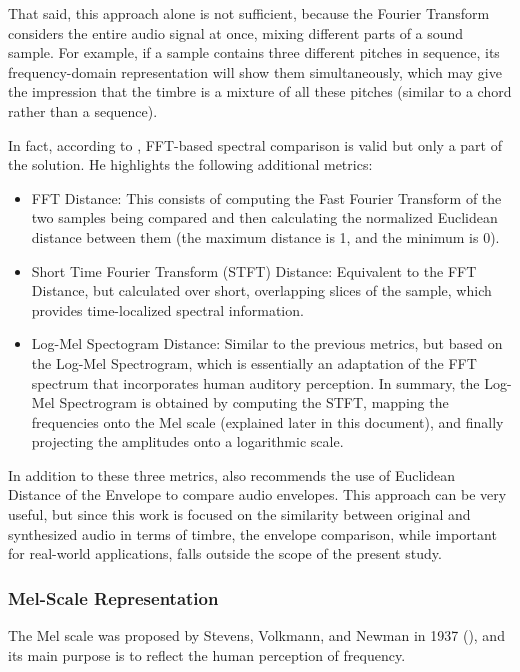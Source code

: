 \documentclass[sigconf,natbib=false]{acmart}
\begin{document}
That said, this approach alone is not sufficient, because the Fourier Transform considers the entire audio signal at once, mixing different parts of a sound sample. For example, if a sample contains three different pitches in sequence, its frequency-domain representation will show them simultaneously, which may give the impression that the timbre is a mixture of all these pitches (similar to a chord rather than a sequence).

In fact, according to \textcite{claesson2021resynthesis}, FFT-based spectral comparison is valid but only a part of the solution. He highlights the following additional metrics:

\begin{itemize}
    \item FFT Distance: This consists of computing the Fast Fourier Transform of the two samples being compared and then calculating the normalized Euclidean distance between them (the maximum distance is 1, and the minimum is 0).
    \item Short Time Fourier Transform (STFT) Distance: Equivalent to the FFT Distance, but calculated over short, overlapping slices of the sample, which provides time-localized spectral information.
    \item Log-Mel Spectogram Distance: Similar to the previous metrics, but based on the Log-Mel Spectrogram, which is essentially an adaptation of the FFT spectrum that incorporates human auditory perception. In summary, the Log-Mel Spectrogram is obtained by computing the STFT, mapping the frequencies onto the Mel scale (explained later in this document), and finally projecting the amplitudes onto a logarithmic scale.
\end{itemize}

In addition to these three metrics, \textcite{claesson2021resynthesis} also recommends the use of Euclidean Distance of the Envelope to compare audio envelopes. This approach can be very useful, but since this work is focused on the similarity between original and synthesized audio in terms of timbre, the envelope comparison, while important for real-world applications, falls outside the scope of the present study.

\subsubsection{Mel-Scale Representation}

The Mel scale was proposed by Stevens, Volkmann, and Newman in 1937 (\textcite{claesson2021resynthesis}), and its main purpose is to reflect the human perception of frequency.
\end{document}
